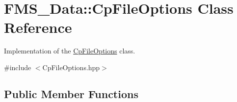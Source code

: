 \hypertarget{classFMS__Data_1_1CpFileOptions}{
\section{FMS\_\-Data::CpFileOptions Class Reference}
\label{classFMS__Data_1_1CpFileOptions}
}


Implementation of the \hyperlink{classFMS__Data_1_1CpFileOptions}{CpFileOptions} class.  




{\ttfamily \#include $<$CpFileOptions.hpp$>$}

\subsection*{Public Member Functions}
